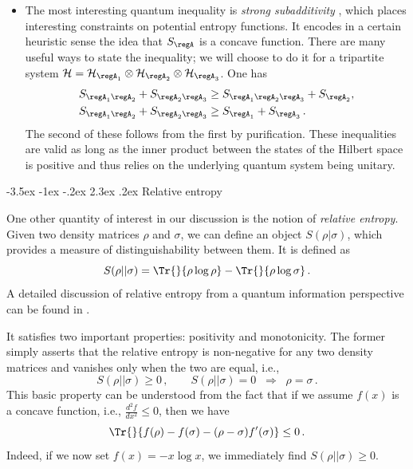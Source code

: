 \documentclass[12pt,openany]{book}
\makeatletter
\renewcommand\section{\@startsection {section}{1}{\z@}%
                                   {-3.5ex \@plus -1ex \@minus -.2ex}%
                                   {2.3ex \@plus.2ex}%
                                   {\normalfont\large\bfseries}}
\makeatother
\begin{document}
\begin{itemize}
\item The most interesting quantum inequality is {\em strong subadditivity}  \cite{Lieb:1973lr,Lieb:1973cp}, which places interesting constraints on potential entropy functions.  It encodes in a certain heuristic sense the idea that $S_\regA$ is a concave function. There are many useful ways to state the inequality; we will choose to do it for a tripartite system
${\cal H}= {\cal H}_{\regA _1}\otimes {\cal H}_{\regA_2} \otimes {\cal H}_{\regA_3}$. One has
%
\begin{align}
 S_{\regA_1 \regA_2}+S_{\regA_2 \regA_3}  & \geq S_{\regA_1 \regA_2 \regA_3}+ S_{\regA_2},
 \label{eq:ssa1}\\
 S_{\regA_1 \regA_2}+S_{\regA_2 \regA_3}  & \geq
S_{\regA_1}+ S_{\regA_3} \,.
 \label{eq:ssa2}
\end{align}
%
The second of these follows from the first by purification.  These inequalities are valid as long as the inner product between the states of the Hilbert space is positive and thus relies on the underlying quantum system being unitary.
\end{itemize}

\section{Relative entropy}
\label{sec:relent}

One other quantity of interest in our discussion is the notion of \emph{relative entropy}. Given two density matrices $\rho$ and $\sigma$, we can define an object  $S(\rho|\sigma)$, which provides a measure of distinguishability between them. It is  defined as
%
\begin{equation}
S(\rho||\sigma)=\Tr{}{\rho\log \rho}-\Tr{}{\rho\log \sigma}\,.
\label{eq:relent}
\end{equation}
%
 A detailed discussion of  relative entropy from a quantum information perspective can be found in \cite{Wehrl:1978zz,Vedral:2002zz}.

It satisfies two important properties: positivity and monotonicity. The former simply asserts that the relative entropy is non-negative for any two density matrices and vanishes only when the two are equal, i.e.,
%
\begin{equation}
S(\rho||\sigma) \geq 0 \,, \qquad S(\rho||\sigma) = 0 \;\; \Longrightarrow \;\; \rho=\sigma\,.
\label{eq:repos}
\end{equation}
%
 This basic property can be understood from the fact that
if we assume $f(x)$ is a concave function, i.e., $\frac{d^2f}{dx^2} \leq 0$, then we have
%
\begin{equation}
\Tr{}{ f(\rho)-f(\sigma)-(\rho-\sigma)f'(\sigma) } \leq 0\,.
\end{equation}
%
Indeed, if we  now set $f(x)=-x\log x$, we immediately find $S(\rho||\sigma)\geq 0$.
\end{document}
